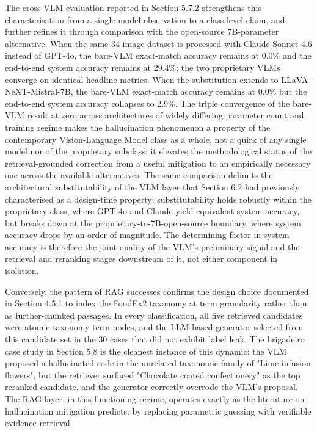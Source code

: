 The cross-VLM evaluation reported in Section 5.7.2 strengthens this characterisation from a single-model observation to a class-level claim, and further refines it through comparison with the open-source 7B-parameter alternative. When the same 34-image dataset is processed with Claude Sonnet 4.6 instead of GPT-4o, the bare-VLM exact-match accuracy remains at 0.0\% and the end-to-end system accuracy remains at 29.4\%; the two proprietary VLMs converge on identical headline metrics. When the substitution extends to LLaVA-NeXT-Mistral-7B, the bare-VLM exact-match accuracy remains at 0.0\% but the end-to-end system accuracy collapses to 2.9\%. The triple convergence of the bare-VLM result at zero across architectures of widely differing parameter count and training regime makes the hallucination phenomenon a property of the contemporary Vision-Language Model class as a whole, not a quirk of any single model nor of the proprietary subclass; it elevates the methodological status of the retrieval-grounded correction from a useful mitigation to an empirically necessary one across the available alternatives. The same comparison delimits the architectural substitutability of the VLM layer that Section 6.2 had previously characterised as a design-time property: substitutability holds robustly within the proprietary class, where GPT-4o and Claude yield equivalent system accuracy, but breaks down at the proprietary-to-7B-open-source boundary, where system accuracy drops by an order of magnitude. The determining factor in system accuracy is therefore the joint quality of the VLM's preliminary signal and the retrieval and reranking stages downstream of it, not either component in isolation.

Conversely, the pattern of RAG successes confirms the design choice documented in Section 4.5.1 to index the FoodEx2 taxonomy at term granularity rather than as further-chunked passages. In every classification, all five retrieved candidates were atomic taxonomy term nodes, and the LLM-based generator selected from this candidate set in the 30 cases that did not exhibit label leak. The brigadeiro case study in Section 5.8 is the cleanest instance of this dynamic: the VLM proposed a hallucinated code in the unrelated taxonomic family of "Lime infusion flowers", but the retriever surfaced "Chocolate coated confectionery" as the top reranked candidate, and the generator correctly overrode the VLM's proposal. The RAG layer, in this functioning regime, operates exactly as the literature on hallucination mitigation predicts: by replacing parametric guessing with verifiable evidence retrieval.

